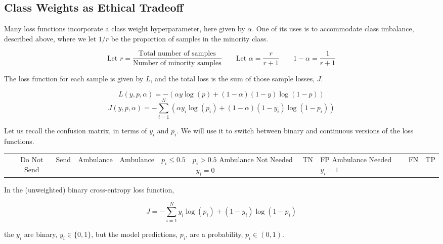 \subsection{Class Weights as Ethical Tradeoff}

Many loss functions incorporate a class weight hyperparameter, here given by $\alpha$.  One of its uses is to accommodate class imbalance, described above, where we let $1/r$ be the proportion of samples in the minority class.

$$\text{Let } r = \frac{ \text{Total number of samples}}{\text{Number of minority samples}} \qquad  \text{Let } \alpha = \frac{r}{r+1} \qquad 1-\alpha = \frac{1}{r+1}$$

The loss function for each sample is given by $L$, and the total loss is the sum of those sample losses, $J$.  

$$L(y,p,\alpha) = - 
	\left( 
		\alpha y \log \left( p \right) + 
		\left( 1-\alpha \right) \left( 1-y \right) \log \left( 1-p \right) 
	\right) 
$$
$$J(y,p,\alpha) = - \sum_{i=1}^N 
	\left( 
		\alpha y_i \log \left( p_i \right) + 
		\left( 1-\alpha \right) \left( 1-y_i \right) \log \left( 1-p_i \right) 
	\right) 
$$

Let us recall the confusion matrix, in terms of $y_i$ and $p_i$.  We will use it to switch between binary and continuous versions of the loss functions.

\begin{center}
\begin{tabular}{r|c|c|c|}
	& Do Not Send & Send \cr
	& Ambulance & Ambulance \cr
	& $p_i \le 0.5$ & $p_i>0.5$  \vrule width 0pt height 0 pt depth 5pt \cr \hline
	Ambulance Not Needed \  $y_i=0$ & TN & FP \vrule width 0pt height 11pt depth 5pt \cr \hline
	Ambulance Needed \   $y_i=1$ & FN & TP \vrule width 0pt height 11pt depth 5pt \cr\hline
\end{tabular}
\end{center}

In the (unweighted) binary cross-entropy loss function, 

$$J = -\sum_{i=1}^N y_i \log( p_i) + (1-y_i) \log( 1 - p_i)$$

the $y_i$ are binary, $y_i \in \{0,1\}$, but the model predictions, $p_i$, are a probability, $p_i \in (0,1)$.  


